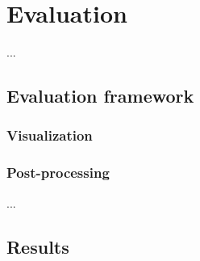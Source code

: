 
\chapter{Evaluation}
...


\section{Evaluation framework}

\subsection{Visualization}

\subsection{Post-processing}
...


\section{Results}